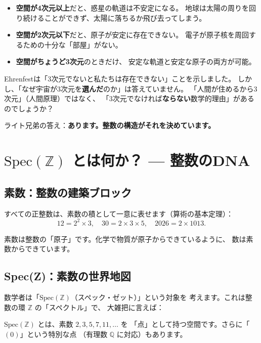 \documentclass[12pt,a4paper]{article}
\begin{document}
\begin{keypoint}[Ehrenfestの発見]
\begin{itemize}
  \item \textbf{空間が4次元以上}だと、惑星の軌道は不安定になる。
    地球は太陽の周りを回り続けることができず、太陽に落ちるか飛び去ってしまう。
  \item \textbf{空間が2次元以下}だと、原子が安定に存在できない。
    電子が原子核を周回するための十分な「部屋」がない。
  \item \textbf{空間がちょうど3次元}のときだけ、
    安定な軌道と安定な原子の両方が可能。
\end{itemize}
\end{keypoint}

Ehrenfestは「3次元でないと私たちは存在できない」ことを示しました。
しかし、「なぜ宇宙が3次元を\textbf{選んだ}のか」は答えていません。
「人間が住めるから3次元」（人間原理）ではなく、
「3次元でなければ\textbf{ならない}数学的理由」があるのでしょうか？

ライト兄弟の答え：\textbf{あります。整数の構造がそれを決めています。}

\section{$\mathrm{Spec}(\mathbb{Z})$ とは何か？ --- 整数のDNA}

\subsection{素数：整数の建築ブロック}

すべての正整数は、素数の積として一意に表せます（算術の基本定理）：
\[
  12 = 2^2 \times 3, \quad 30 = 2 \times 3 \times 5, \quad 2026 = 2 \times 1013.
\]

素数は整数の「原子」です。化学で物質が原子からできているように、
数は素数からできています。

\subsection{Spec(Z)：素数の世界地図}

数学者は「$\mathrm{Spec}(\mathbb{Z})$（スペック・ゼット）」という対象を
考えます。これは整数の環 $\mathbb{Z}$ の「スペクトル」で、
大雑把に言えば：

\begin{keypoint}
$\mathrm{Spec}(\mathbb{Z})$ とは、素数 $2, 3, 5, 7, 11, \ldots$ を
「点」として持つ空間です。さらに「$(0)$」という特別な点
（有理数 $\mathbb{Q}$ に対応）もあります。
\end{keypoint}
\end{document}
